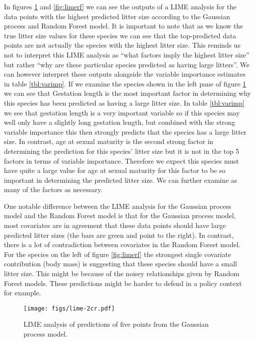 \documentclass[10pt,]{article}
\begin{document}
In figures \ref{fig:limegp} and \ref{fig:limerf} we can see the outputs of a LIME analysis for the data points with the highest predicted litter size according to the Gaussian process and Random Forest model.
It is important to note that as we know the true litter size values for these species we can see that the top-predicted data points are not actually the species with the highest litter size.
This reminds us not to interpret this LIME analysis as ``what factors imply the highest litter size'' but rather ``why are these particular species predicted as having large litters''.
We can however interpret these outputs alongside the variable importance estimates in table \ref{tbl:varimp}.
If we examine the species shown in the left pane of figure \ref{fig:limegp} we can see that Gestation length is the most important factor in determining why this species has been predicted as having a large litter size.
In table \ref{tbl:varimp} we see that gestation length is a very important variable so if this species may well only have a slightly long gestation length, but combined with the strong variable importance this then strongly predicts that the species has a large litter size.
In contrast, age at sexual maturity is the second strong factor in determining the prediction for this species' litter size but it is not in the top 5 factors in terms of variable importance.
Therefore we expect this species must have quite a large value for age at sexual maturity for this factor to be so important in determining the predicted litter size.
We can further examine as many of the factors as necessary.

One notable difference between the LIME analysis for the Gaussian process model and the Random Forest model is that for the Gaussian process model, most covariates are in agreement that these data points should have large predicted litter sizes (the bars are green and point to the right).
In contrast, there is a lot of contradiction between covariates in the Random Forest model.
For the species on the left of figure \ref{fig:limerf} the strongest single covariate contribution (body mass) is suggesting that these species should have a small litter size.
This might be because of the noisey relationships given by Random Forest models.
These predictions might be harder to defend in a policy context for example.


\begin{figure}[t!]
\centering
\texttt{[image: figs/lime-2cr.pdf]}
\caption{LIME analysis of predictions of five points from the Gaussian process model.\protect\label{fig:limegp}}
\end{figure}
\end{document}
